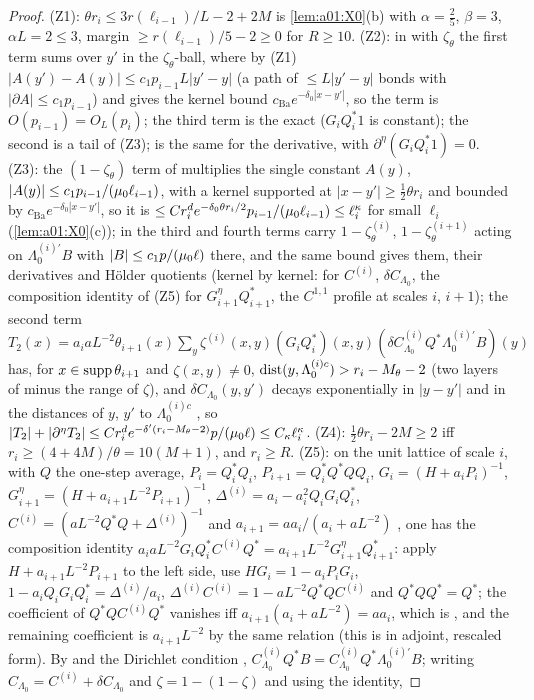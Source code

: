 \begin{proof}
(Z1): $\theta r_i\le3r(\ell_{i-1})/L-2+2M$ is \cref{lem:a01:X0}(b) with $\alpha=\frac25$, $\beta=3$, $\alpha L=2\le3$, margin $\ge r(\ell_{i-1})/5-2\ge0$ for $R\ge10$. (Z2): in \cite[(2.61)]{Ba2} with $\zeta_\theta$ the first term sums over $y'$ in the $\zeta_\theta$-ball, where by (Z1) $|A(y')-A(y)|\le c_1p_{i-1}L|y'-y|$ (a path of $\le L|y'-y|$ bonds with $|\partial A|\le c_1p_{i-1}$) and \cite[Prop.~2.2]{Ba2} gives the kernel bound $c_{\mathrm{Ba}}e^{-\delta_0|x-y'|}$, so the term is $O(p_{i-1})=O_L(p_i)$; the third term is the exact \cite[(2.62)--(2.63)]{Ba2} ($G_iQ_i^*1$ is constant); the second is a tail of (Z3); \cite[(2.64)]{Ba2} is the same for the derivative, with $\partial^\eta(G_iQ_i^*1)=0$. (Z3): the $(1-\zeta_\theta)$ term of \cite[(2.61)]{Ba2} multiplies the single constant $A(y)$, $|A(y)|\le c_1p_{i-1}/(\mu_0\ell_{i-1})$, with a kernel supported at $|x-y'|\ge\frac12\theta r_i$ and bounded by $c_{\mathrm{Ba}}e^{-\delta_0|x-y'|}$, so it is $\le Cr_i^de^{-\delta_0\theta r_i/2}p_{i-1}/(\mu_0\ell_{i-1})\le\ell_i^\kappa$ for small $\ell_i$ (\cref{lem:a01:X0}(c)); in \cite[(2.89)]{Ba2} the third and fourth terms carry $1-\zeta^{(i)}_\theta$, $1-\zeta^{(i+1)}_\theta$ acting on $\Lambda_0^{(i)\prime}B$ with $|B|\le c_1p/(\mu_0\ell)$ there, and the same bound gives them, their derivatives and H\"older quotients (kernel by kernel: \cite[(2.34), (2.36)]{Ba1} for $C^{(i)}$, $\delta C_{\Lambda_0}$, the composition identity of (Z5) for $G^\eta_{i+1}Q_{i+1}^*$, the $C^{1,1}$ profile at scales $i$, $i+1$); the second term $T_2(x)=a_iaL^{-2}\theta_{i+1}(x)\sum_y\zeta^{(i)}(x,y)(G_iQ_i^*)(x,y)(\delta C^{(i)}_{\Lambda_0}Q^*\Lambda_0^{(i)\prime}B)(y)$ has, for $x\in\operatorname{supp}\theta_{i+1}$ and $\zeta(x,y)\ne0$, $\operatorname{dist}(y,\Lambda_0^{(i)c})>r_i-M_\theta-2$ (two layers of \cite[(2.8)]{Ba2} minus the range of $\zeta$), and $\delta C_{\Lambda_0}(y,y')$ decays exponentially in $|y-y'|$ and in the distances of $y$, $y'$ to $\Lambda_0^{(i)c}$ \cite[(2.35)]{Ba1}, so $|T_2|+|\partial^\eta T_2|\le Cr_i^de^{-\delta'(r_i-M_\theta-2)}p/(\mu_0\ell)\le C_\kappa\ell_i^\kappa$. (Z4): $\frac12\theta r_i-2M\ge2$ iff $r_i\ge(4+4M)/\theta=10(M+1)$, and $r_i\ge R$. (Z5): on the unit lattice of scale $i$, with $Q$ the one-step average, $P_i=Q_i^*Q_i$, $P_{i+1}=Q_i^*Q^*QQ_i$, $G_i=(H+a_iP_i)^{-1}$, $G^\eta_{i+1}=(H+a_{i+1}L^{-2}P_{i+1})^{-1}$, $\Delta^{(i)}=a_i-a_i^2Q_iG_iQ_i^*$, $C^{(i)}=(aL^{-2}Q^*Q+\Delta^{(i)})^{-1}$ and $a_{i+1}=aa_i/(a_i+aL^{-2})$ \cite[(2.13), (2.21), (2.31)]{Ba1}, one has the composition identity $a_iaL^{-2}G_iQ_i^*C^{(i)}Q^*=a_{i+1}L^{-2}G^\eta_{i+1}Q^*_{i+1}$: apply $H+a_{i+1}L^{-2}P_{i+1}$ to the left side, use $HG_i=1-a_iP_iG_i$, $1-a_iQ_iG_iQ_i^*=\Delta^{(i)}/a_i$, $\Delta^{(i)}C^{(i)}=1-aL^{-2}Q^*QC^{(i)}$ and $Q^*QQ^*=Q^*$; the coefficient of $Q^*QC^{(i)}Q^*$ vanishes iff $a_{i+1}(a_i+aL^{-2})=aa_i$, which is \cite[(2.13)]{Ba1}, and the remaining coefficient is $a_{i+1}L^{-2}$ by the same relation (this is \cite[(2.41)]{Ba1} in adjoint, rescaled form). By \cite[(2.80)]{Ba2} and the Dirichlet condition \cite[(2.32)]{Ba1}, $C^{(i)}_{\Lambda_0}Q^*B=C^{(i)}_{\Lambda_0}Q^*\Lambda_0^{(i)\prime}B$; writing $C_{\Lambda_0}=C^{(i)}+\delta C_{\Lambda_0}$ and $\zeta=1-(1-\zeta)$ and using the identity, 
\end{proof}
